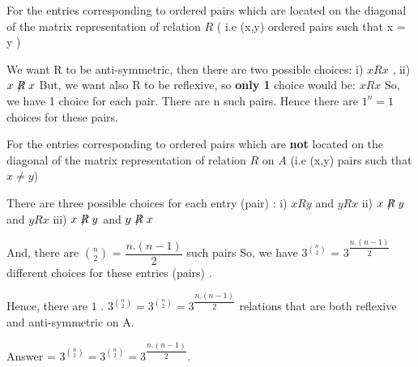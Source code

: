 \documentclass[11pt]{article}
\begin{document}
\noindent For the entries corresponding to ordered pairs which are located on the diagonal of the matrix representation of relation $R$ ( i.e (x,y) ordered pairs such that x = y ) \newline

\noindent We want R to be anti-symmetric, then there are two possible choices: i) $xRx$ , ii) $x\not \mathrel{R}x$
\newline \newline
But, we want also R to be reflexive, so \textbf{only 1} choice would be: $xRx$ \newline \newline
\noindent So, we have 1 choice for each pair. There are n such pairs. Hence there are $1^n = 1$ choices for these pairs. \newline \newline

\noindent For the entries corresponding to ordered pairs which are \textbf{not} located on the diagonal of the matrix representation of relation $R$ on $A$ (i.e (x,y) pairs such that $x \neq y$) \newline \newline

\noindent There are three possible choices for each entry (pair) : \newline \newline
i) $xRy$ and $yRx$ \newline
ii) $x\not\mathrel{R}y$ and $yRx$ \newline
iii) $x\not\mathrel{R}y$ and $y\not\mathrel{R}x$ \newline \newline

\noindent And, there are ${n \choose 2}$ = $\dfrac{n.(n-1)}{2}$ such pairs \newline
\newline So, we have $3^{n \choose 2}$ = $3^{\dfrac{n.(n-1)}{2}}$ different choices for these entries (pairs) . \newline \newline \newline

\noindent Hence, there are $1$ . $3^{n \choose 2} = 3^{n \choose 2} = 3^{\dfrac{n.(n-1)}{2}}$ relations that are both reflexive and anti-symmetric on A. \newline \newline \newline


\noindent Answer = $3^{n \choose 2} = 3^{n \choose 2} = 3^{\dfrac{n.(n-1)}{2}}$. 
 
\end{document}
